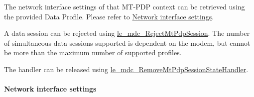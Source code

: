 The network interface settings of that M\+T-\/\+P\+D\+P context can be retrieved using the provided Data Profile. Please refer to \hyperlink{c_mdc_le_mdc_session_networkItf}{Network interface settings}.

A data session can be rejected using \hyperlink{le__mdc__interface_8h_ae3b49edad910960b84a9012ecc33c66a}{le\+\_\+mdc\+\_\+\+Reject\+Mt\+Pdp\+Session}. The number of simultaneous data sessions supported is dependent on the modem, but cannot be more than the maximum number of supported profiles.

The handler can be released using \hyperlink{le__mdc__interface_8h_ad296518ad496c960b4b23f89f7a1b222}{le\+\_\+mdc\+\_\+\+Remove\+Mt\+Pdp\+Session\+State\+Handler}.\hypertarget{c_mdc_le_mdc_session_networkItf}{}\paragraph{Network interface settings}\label{c_mdc_le_mdc_session_networkItf}
